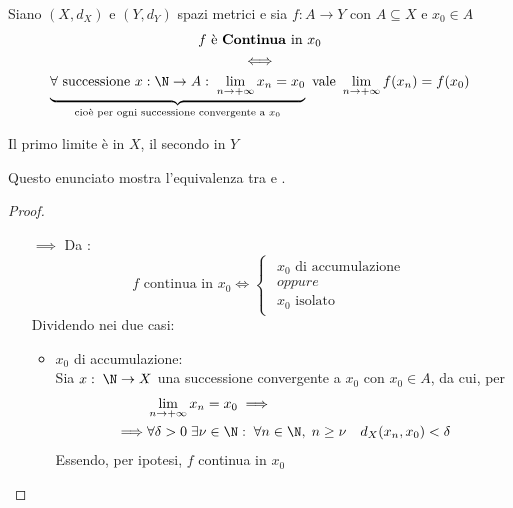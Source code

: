 \begin{proposition}
	\label{prop:cont_e_cont_per_succ}
	Siano $(X,d_X)$ e $(Y,d_Y)$ spazi metrici e sia $f: A \to Y$ con $A \subseteq X$ e $x_0 \in A$
	\begin{equation*}
		\begin{gathered}
			f \text{ è \textbf{Continua} in } x_0\\
			\iff\\
			\underbrace{\forall \text{ successione } x:\N \to A:\; \lim\limits_{n \to +\infty} x_n = x_0}_{\text{cioè per ogni successione convergente a } x_0} \text{ vale } \lim\limits_{n \to +\infty} f(x_n) = f(x_0)
		\end{gathered}
	\end{equation*}
	\begin{note}
		Il primo limite è in $X$, il secondo in $Y$
	\end{note}
	\begin{note}
		Questo enunciato mostra l'equivalenza tra  e .
	\end{note}
	\begin{proof}~
		\begin{itemize}
			\item[$\implies$] Da :
			\[f \text{ continua in } x_0 \iff
				\begin{cases}
					\begin{array}{c}
						x_0 \text{ di accumulazione}\\
						oppure\\
						x_0 \text{ isolato}
					\end{array}
				\end{cases}\]
				Dividendo nei due casi:
				\begin{itemize}
					\item $x_0$ di accumulazione:\\
						Sia $x:\; \N \to X$ una successione convergente a $x_0$ con $x_0 \in A$, da cui, per 
						\begin{align*}
							& \lim\limits_{n \to +\infty} x_n = x_0 \implies\\
							\implies & \forall \delta > 0\; \exists \nu \in \N:\; \forall n \in \N,\; n \geq \nu \quad d_X(x_n, x_0) < \delta
						\end{align*}
						Essendo, per ipotesi, $f$ continua in $x_0$
						\begin{equation*}

\end{equation*}
\end{itemize}
\end{itemize}
\end{proof}
\end{proposition}
